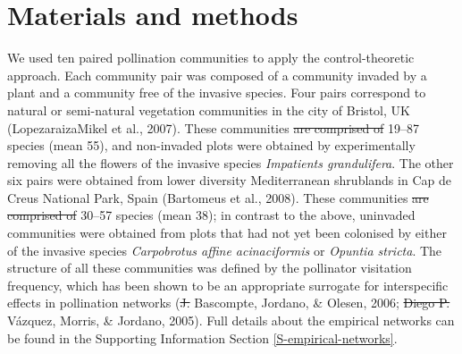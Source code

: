 \documentclass[a4paper]{artikel1}
\theoremstyle{definition}
\theoremstyle{definition}
\theoremstyle{definition}
\theoremstyle{remark}
\providecommand{\DIFaddtex}[1]{{\protect\color{blue}\uwave{#1}}} %
\providecommand{\DIFdeltex}[1]{{\protect\color{red}\sout{#1}}}                      %
\providecommand{\DIFaddbegin}{} %
\providecommand{\DIFaddend}{} %
\providecommand{\DIFdelbegin}{} %
\providecommand{\DIFdelend}{} %
\providecommand{\DIFadd}[1]{\texorpdfstring{\DIFaddtex{#1}}{#1}} %
\providecommand{\DIFdel}[1]{\texorpdfstring{\DIFdeltex{#1}}{}} %
\begin{document}
\DIFaddend \section{Materials and methods}\label{materials-and-methods}

We used ten paired pollination communities to apply the
control-theoretic approach. Each community pair was composed of a
community invaded by a plant and a community free of the invasive
species. Four pairs correspond to natural or semi-natural vegetation
communities in the city of Bristol, UK (Lopezaraiza\textendash{}Mikel et
al., 2007). These communities \DIFdelbegin \DIFdel{are comprised of }\DIFdelend \DIFaddbegin \DIFadd{comprised }\DIFaddend 19--87 species (mean 55), and
non-invaded plots were obtained by experimentally removing all the
flowers of the invasive species \emph{Impatients grandulifera}. The
other six pairs were obtained from lower diversity Mediterranean
shrublands in Cap de Creus National Park, Spain (Bartomeus et al.,
2008). These communities \DIFdelbegin \DIFdel{are comprised of }\DIFdelend \DIFaddbegin \DIFadd{comprised }\DIFaddend 30--57 species (mean 38); in contrast
to the above, uninvaded communities were obtained from plots that had
not yet been colonised by either of the invasive species
\emph{Carpobrotus affine acinaciformis} or \emph{Opuntia stricta}. The
structure of all these communities was defined by the pollinator
visitation frequency, which has been shown to be an appropriate
surrogate for interspecific effects in pollination networks (\DIFdelbegin \DIFdel{J.
}\DIFdelend Bascompte,
Jordano, \& Olesen, 2006; \DIFdelbegin \DIFdel{Diego P. }\DIFdelend Vázquez, Morris, \& Jordano, 2005). Full
details about the empirical networks can be found in the Supporting
Information Section \ref{S-empirical-networks}.
\end{document}
